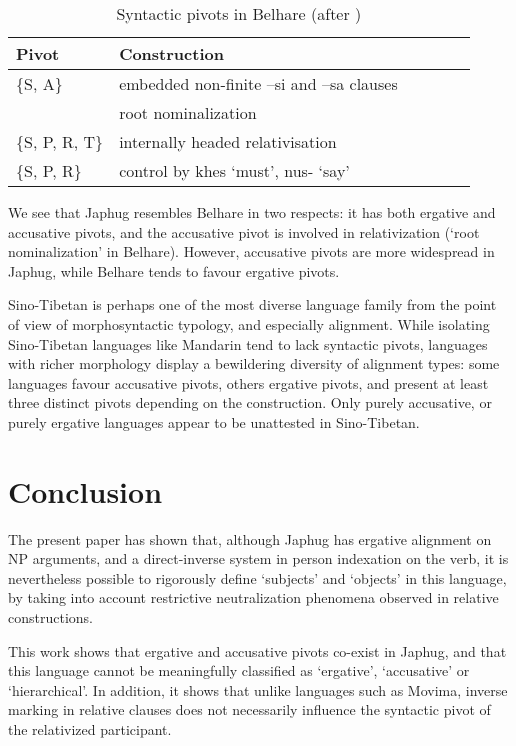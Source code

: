 \documentclass[oldfontcommands,oneside,a4paper,11pt]{article}
\newcommand{\ipa}[1]{{\phon #1}} %
\begin{document}
\begin{table}[H]
\caption{Syntactic pivots in Belhare (after \citealt{bickel04hidden})} \label{tab:belhare} \centering
\begin{tabular}{llllll}
\toprule
Pivot & Construction \\
\midrule
\{S, A\} & embedded non-finite \ipa{--si} and \ipa{--sa} clauses\\
& root nominalization\\
\{S, P, R, T\} & internally headed relativisation \\
\{S, P, R\} & control by \ipa{khes} `must', \ipa{nus-} `say'\\
\bottomrule
\end{tabular}
\end{table}

 
We see that Japhug resembles Belhare in two respects: it has both ergative and accusative pivots, and the accusative pivot is involved in relativization (`root nominalization' in Belhare). However, accusative pivots  are  more widespread in Japhug, while Belhare tends to favour ergative pivots.  


Sino-Tibetan is perhaps one of the most diverse language family from the point of view of morphosyntactic typology, and especially alignment. While isolating Sino-Tibetan languages like Mandarin tend to lack syntactic pivots, languages with richer morphology display a bewildering diversity of alignment types: some languages favour accusative pivots, others ergative pivots, and present at least three distinct   pivots depending on the  construction. Only purely accusative, or purely ergative languages appear to be unattested in Sino-Tibetan.


\section{Conclusion}

The present paper has shown that, although Japhug has ergative alignment on NP arguments, and a direct-inverse system in person indexation on the verb, it is nevertheless possible to rigorously define `subjects' and `objects' in this language, by taking into account restrictive neutralization phenomena observed in relative constructions.

This work shows that ergative and accusative pivots co-exist in Japhug, and that this language cannot be meaningfully classified as `ergative', `accusative' or `hierarchical'. In addition, it shows that unlike languages such as Movima, inverse marking in relative clauses does not necessarily influence the syntactic pivot of the relativized participant.



\end{document}

